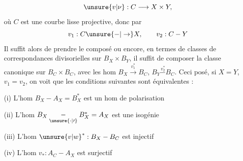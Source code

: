 \[
\unsure{v|\nu}: C\longrightarrow X\times Y,
\]
où $C$ est une courbe lisse projective, donc par
\[
v_1:C\unsure{\mathbin{-}|\to}X,\qquad v_2:C\mathbin{-}Y
\]
Il suffit alors de prendre le composé
ou encore, en termes de classes de correspondances divisorielles sur $B_X\times B_Y$, il suffit de composer la classe  canonique sur $B_C\times B_C$, avec les hom $B_X\xrightarrow{v_1^*}B_C$, $B_Y\overset{v_2^*}{\mathbin{-}}B_C$. Ceci posé, si $X=Y$, $v_1=v_2$, on voit que  les conditions suivantes sont équivalentes :

(i) L'hom $B_X\mathbin{-}A_X=B_X^*$ est un hom de polarisation

(ii) L'hom $B_X\underset{\unsure{\cdot|\prime}}{\mathbin{-}}B_X^*=A_X$ est une isogénie

(iii) L'hom $\unsure{v|w}^*:B_X\mathbin{-}B_C$ est injectif 

(iv) L'hom $v_*:A_C\mathbin{-}A_X$ est surjectif


